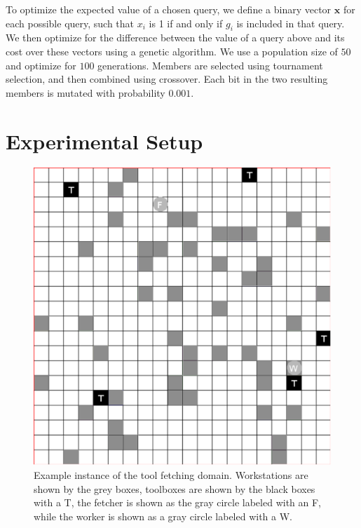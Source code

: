 \documentclass[letterpaper]{article}
\begin{document}
To optimize the expected value of a chosen query, we define a binary vector $\textbf{x}$ for each possible query, such that $x_i$ is 1 if and only if $g_i$ is included in that query. We then optimize for the difference between the value of a query above and its cost over these vectors using a genetic algorithm. We use a population size of $50$ and optimize for $100$ generations. Members are selected using tournament selection, and then combined using crossover. Each bit in the two resulting members is mutated with probability $0.001$.



\section{Experimental Setup}
\begin{figure}
    \centering
    \includegraphics[width=0.6\linewidth]{Figures/ToolFetchingDomain_MultiTools_2.pdf}
    \caption{Example instance of the tool fetching domain. Workstations are shown by the grey boxes, toolboxes are shown by the black boxes with a T, the fetcher is shown as the gray circle labeled with an F, while the worker is shown as a gray circle labeled with a W.}
    \label{fig:domain_example}
\end{figure}
\end{document}

